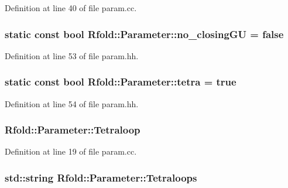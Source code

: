 Definition at line 40 of file param.\+cc.

\hypertarget{namespace_rfold_1_1_parameter_a312a98d9462d203bcef26ce195b94bca}{
\subsubsection[{no\+\_\+closing\+G\+U}]{\setlength{\rightskip}{0pt plus 5cm}static const bool Rfold\+::\+Parameter\+::no\+\_\+closing\+G\+U = false}}\label{namespace_rfold_1_1_parameter_a312a98d9462d203bcef26ce195b94bca}


Definition at line 53 of file param.\+hh.

\hypertarget{namespace_rfold_1_1_parameter_a38a90dcb0eaf3b35fbed6230d5f8a389}{
\subsubsection[{tetra}]{\setlength{\rightskip}{0pt plus 5cm}static const bool Rfold\+::\+Parameter\+::tetra = true}}\label{namespace_rfold_1_1_parameter_a38a90dcb0eaf3b35fbed6230d5f8a389}


Definition at line 54 of file param.\+hh.

\hypertarget{namespace_rfold_1_1_parameter_a5ebb2605e5088c56cd2a015f2ea1f487}{
\subsubsection[{Tetraloop}]{ Rfold\+::\+Parameter\+::\+Tetraloop}}\label{namespace_rfold_1_1_parameter_a5ebb2605e5088c56cd2a015f2ea1f487}


Definition at line 19 of file param.\+cc.

\hypertarget{namespace_rfold_1_1_parameter_aae84b42c9bbd350811296e721cf54d34}{
\subsubsection[{Tetraloops}]{\setlength{\rightskip}{0pt plus 5cm}std\+::string Rfold\+::\+Parameter\+::\+Tetraloops}}\label{namespace_rfold_1_1_parameter_aae84b42c9bbd350811296e721cf54d34}


